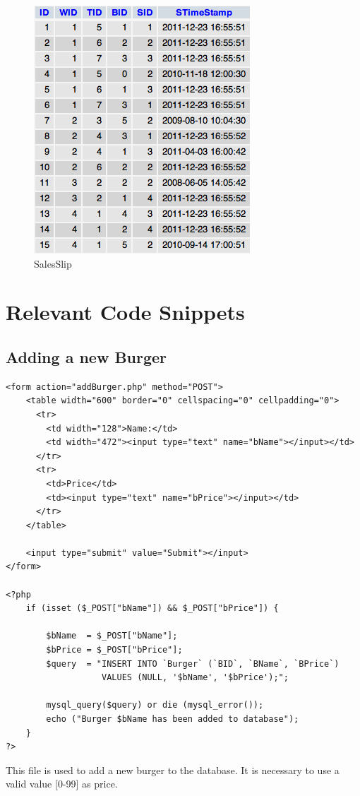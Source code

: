 \documentclass[10pt, a4paper]{article}
\begin{document}
\begin{figure}[htb]
	\centering
	\includegraphics[scale=0.9]{fig/salesslip.png}
	\caption{SalesSlip}
\end{figure}

\pagebreak
\section{Relevant Code Snippets}
\subsection{Adding a new Burger}

\begin{lstlisting}[caption=addBurger.php]
<form action="addBurger.php" method="POST">
    <table width="600" border="0" cellspacing="0" cellpadding="0">
      <tr>
        <td width="128">Name:</td>
        <td width="472"><input type="text" name="bName"></input></td>
      </tr>
      <tr>
        <td>Price</td>
        <td><input type="text" name="bPrice"></input></td>
      </tr>
    </table>
    
    <input type="submit" value="Submit"></input>
</form>

<?php
    if (isset ($_POST["bName"]) && $_POST["bPrice"]) {
        
        $bName  = $_POST["bName"];
        $bPrice = $_POST["bPrice"];
        $query  = "INSERT INTO `Burger` (`BID`, `BName`, `BPrice`)
                   VALUES (NULL, '$bName', '$bPrice');";
        
        mysql_query($query) or die (mysql_error());
        echo ("Burger $bName has been added to database");
    }
?>
\end{lstlisting}
This file is used to add a new burger to the database. It is necessary to use a valid value [0-99] as price.
\end{document}
